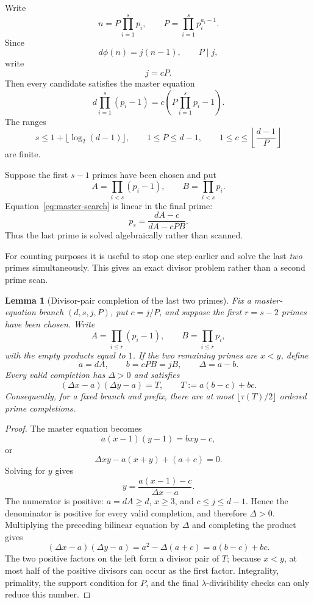 \documentclass[11pt]{article}
\newtheorem{lemma}[theorem]{Lemma}
\begin{document}
Write
\[
n=P\prod_{i=1}^s p_i,
\qquad
P=\prod_{i=1}^s p_i^{a_i-1}.
\]
Since
\[
d\phi(n)=j(n-1),
\qquad
P\mid j,
\]
write
\[
j=cP.
\]
Then every candidate satisfies the master equation
\begin{equation}
d\prod_{i=1}^s(p_i-1)
=
c\left(P\prod_{i=1}^s p_i-1\right).
\label{eq:master-search}
\end{equation}
The ranges
\[
s\le1+\lfloor\log_2(d-1)\rfloor,
\qquad
1\le P\le d-1,
\qquad
1\le c\le\left\lfloor\frac{d-1}{P}\right\rfloor
\]
are finite.

Suppose the first $s-1$ primes have been chosen and put
\[
A=\prod_{i<s}(p_i-1),
\qquad
B=\prod_{i<s}p_i.
\]
Equation~\eqref{eq:master-search} is linear in the final prime:
\begin{equation}
p_s=
\frac{dA-c}{dA-cPB}.
\label{eq:lastprime}
\end{equation}
Thus the last prime is solved algebraically rather than scanned.

For counting purposes it is useful to stop one step earlier and solve the
last \emph{two} primes simultaneously.  This gives an exact divisor problem
rather than a second prime scan.

\begin{lemma}[Divisor-pair completion of the last two primes]
\label{lem:two-prime-completion}
Fix a master-equation branch $(d,s,j,P)$, put $c=j/P$, and suppose the first
$r=s-2$ primes have been chosen.  Write
\[
A=\prod_{i\le r}(p_i-1),\qquad
B=\prod_{i\le r}p_i,
\]
with the empty products equal to $1$.  If the two remaining primes are
$x<y$, define
\[
a=dA,\qquad b=cPB=jB,\qquad \Delta=a-b.
\]
Every valid completion has $\Delta>0$ and satisfies
\begin{equation}
\boxed{
(\Delta x-a)(\Delta y-a)=T,
\qquad
T:=a(b-c)+bc.
}
\label{eq:two-prime-divisor-pair}
\end{equation}
Consequently, for a fixed branch and prefix, there are at most
$\lfloor\tau(T)/2\rfloor$ ordered prime completions.
\end{lemma}

\begin{proof}
The master equation becomes
\[
a(x-1)(y-1)=bxy-c,
\]
or
\[
\Delta xy-a(x+y)+(a+c)=0.
\]
Solving for $y$ gives
\[
y=\frac{a(x-1)-c}{\Delta x-a}.
\]
The numerator is positive: $a=dA\ge d$, $x\ge3$, and $c\le j\le d-1$.
Hence the denominator is positive for every valid completion, and therefore
$\Delta>0$.  Multiplying the preceding bilinear equation by $\Delta$ and
completing the product gives
\[
(\Delta x-a)(\Delta y-a)
=a^2-\Delta(a+c)
=a(b-c)+bc.
\]
The two positive factors on the left form a divisor pair of $T$; because
$x<y$, at most half of the positive divisors can occur as the first factor.
Integrality, primality, the support condition for $P$, and the final
$\lambda$-divisibility checks can only reduce this number.
\end{proof}
\end{document}
